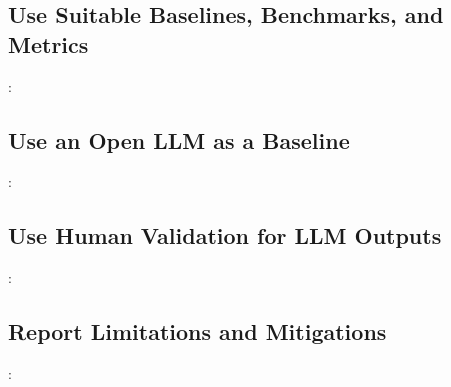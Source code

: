 

\subsection{Use Suitable Baselines, Benchmarks, and Metrics}
\label{sec:use-suitable-baselines-benchmarks-and-metrics}

\vspace{0.5\baselineskip}
\begin{framed}
\summary: %
\end{framed}



\subsection{Use an Open LLM as a Baseline}
\label{sec:use-an-open-llm-as-a-baseline}

\vspace{0.5\baselineskip}
\begin{framed}
\summary: %
\end{framed}



\subsection{Use Human Validation for LLM Outputs}
\label{sec:use-human-validation-for-llm-outputs}

\vspace{0.5\baselineskip}
\begin{framed}
\summary: %
\end{framed}



\subsection{Report Limitations and Mitigations}
\label{sec:report-limitations-and-mitigations}

\vspace{0.5\baselineskip}
\begin{framed}
\summary: %
\end{framed}

